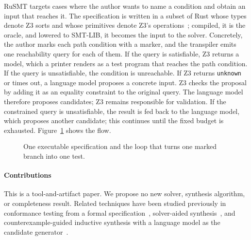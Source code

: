 \documentclass[sigconf,screen]{acmart}
\theoremstyle{definition}
\theoremstyle{remark}
\newcommand{\rusmt}{RuSMT}
\newcommand{\code}[1]{\texttt{#1}}
\begin{document}
\rusmt{} targets cases where the author wants to name a condition and obtain an input that reaches it. 
The specification is written in a subset
of Rust whose types denote Z3 sorts and whose primitives denote Z3's
operations~\cite{demoura2008z3}; compiled, it is the oracle, and lowered to
SMT-LIB, it becomes the input to the solver. Concretely, the author marks each path condition with a marker, and the
transpiler emits one reachability query for each of them. If the query is satisfiable, Z3 returns a model, which a printer renders as a test program that reaches the path condition. If the query is unsatisfiable, the condition is unreachable. If Z3 returns \code{unknown} or times out, a language model proposes a concrete input. Z3 checks the proposal by adding it as an equality constraint to the original query. The language model therefore proposes candidates; Z3 remains responsible for validation. If the constrained query is unsatisfiable, the result is fed back to the language model, which proposes another candidate; this continues until the fixed budget is exhausted. Figure~\ref{fig:pipeline} shows the flow.

\begin{figure}[t]
\centering
\resizebox{\columnwidth}{!}{}
\caption{One executable specification and the loop that turns
one marked branch into one test.}
\label{fig:pipeline}
\end{figure}

\paragraph{Contributions}
This is a tool-and-artifact paper. We propose no new solver, synthesis
algorithm, or completeness result. Related techniques have been studied previously in conformance
testing from a formal specification~\cite{jard2005tgv}, solver-aided
synthesis~\cite{solarlezama2006sketching}, and counterexample-guided inductive synthesis with a language model as the
candidate generator~\cite{jha2023cegisllm}.
\end{document}
